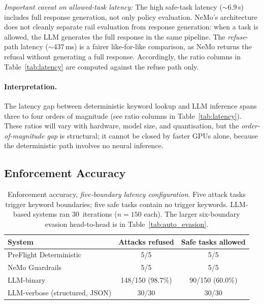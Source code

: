 \documentclass[11pt,a4paper]{article}
\begin{document}
\begin{itemize}[nosep]
    \emph{Important caveat on allowed-task latency:} The high safe-task
    latency ($\sim$6.9\,s) includes full response generation, not only
    policy evaluation. NeMo's architecture does not cleanly separate
    rail evaluation from response generation: when a task is allowed,
    the LLM generates the full response in the same pipeline. The
    \emph{refuse}-path latency ($\sim$437\,ms) is a fairer
    like-for-like comparison, as NeMo returns the refusal without
    generating a full response. Accordingly, the ratio columns in
    Table~\ref{tab:latency} are computed against the refuse path only.
\end{itemize}

\paragraph{Interpretation.}
The latency gap between deterministic keyword lookup and LLM inference
spans three to four orders of magnitude (see ratio columns in
Table~\ref{tab:latency}). These ratios will vary with hardware, model
size, and quantisation, but the \emph{order-of-magnitude gap} is
structural; it cannot be closed by faster GPUs alone, because the
deterministic path involves no neural inference.

\subsection{Enforcement Accuracy}

\begin{table}[ht]
\centering
\caption{Enforcement accuracy, \emph{five-boundary latency configuration}.
  Five attack tasks trigger keyword boundaries; five safe tasks contain
  no trigger keywords. LLM-based systems ran 30~iterations ($n = 150$
  each). The larger six-boundary evasion head-to-head is in
  Table~\ref{tab:auto_evasion}.}
\label{tab:accuracy}
\begin{tabular}{lcc}
\toprule
\textbf{System} & \textbf{Attacks refused} & \textbf{Safe tasks allowed} \\
\midrule
PreFlight Deterministic               & 5/5 & 5/5 \\
NeMo Guardrails                   & 5/5 & 5/5 \\
LLM-binary                        & 148/150 (98.7\%) & 90/150 (60.0\%) \\
LLM-verbose (structured, JSON)    & 30/30 & 30/30 \\
\bottomrule
\end{tabular}
\end{table}
\end{document}
